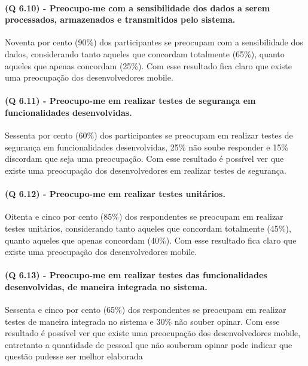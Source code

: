 \paragraph{\textbf{(Q 6.10)} - Preocupo-me com a sensibilidade dos dados a serem processados, armazenados e transmitidos pelo sistema.}

Noventa por cento (90{\%}) dos participantes se preocupam com a sensibilidade dos dados, considerando tanto aqueles que concordam totalmente (65{\%}), quanto aqueles que apenas concordam (25{\%}). Com esse resultado fica claro que existe uma preocupação dos desenvolvedores mobile.

\paragraph{\textbf{(Q 6.11)} - Preocupo-me em realizar testes de segurança em funcionalidades desenvolvidas.}

Sessenta por cento (60{\%}) dos participantes se preocupam em realizar testes de segurança em funcionalidades desenvolvidas, 25{\%} não soube responder e 15{\%} discordam que seja uma preocupação. Com esse resultado é possível ver que existe uma preocupação dos desenvolvedores em realizar testes de segurança.

\paragraph{\textbf{(Q 6.12)} - Preocupo-me em realizar testes unitários.}

Oitenta e cinco por cento (85{\%}) dos respondentes se preocupam em realizar testes unitários, considerando tanto aqueles que concordam totalmente (45{\%}), quanto aqueles que apenas concordam (40{\%}). Com esse resultado fica claro que existe uma preocupação dos desenvolvedores mobile.

\paragraph{\textbf{(Q 6.13)} - Preocupo-me em realizar testes das funcionalidades desenvolvidas, de maneira integrada no sistema.}

Sessenta e cinco por cento (65{\%}) dos respondentes se preocupam em realizar testes de maneira integrada no sistema e 30{\%} não souber opinar. Com esse resultado é possível ver que existe uma preocupação dos desenvolvedores mobile, entretanto a quantidade de pessoal que não souberam opinar pode indicar que questão pudesse ser melhor elaborada

